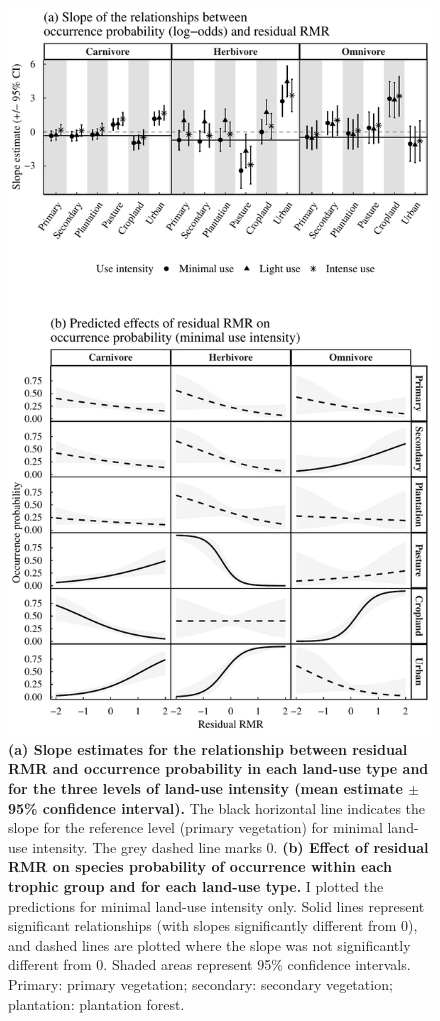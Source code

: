 \clearpage
\begin{figure}[h!]
\centering
\includegraphics[scale=0.65]{figures/Chapter5/Minor_corrections/Figure_predictions_slopes}
\caption[Slope estimates and predictions for the relationship between occurrence probability and residual RMR]{\textbf{(a) Slope estimates for the relationship between residual RMR and occurrence probability in each land-use type and for the three levels of land-use intensity (mean estimate $\pm$95\% confidence interval).} The black horizontal line indicates the slope for the reference level (primary vegetation) for minimal land-use intensity. The grey dashed line marks 0. \textbf{(b) Effect of residual RMR on species probability of occurrence within each trophic group and for each land-use type.} I plotted the predictions for minimal land-use intensity only. Solid lines represent significant relationships (with slopes significantly different from 0), and dashed lines are plotted where the slope was not significantly different from 0. Shaded areas represent 95\% confidence intervals. Primary: primary vegetation; secondary: secondary vegetation; plantation: plantation forest.}
\label{chap5_fig4}
\end{figure}

